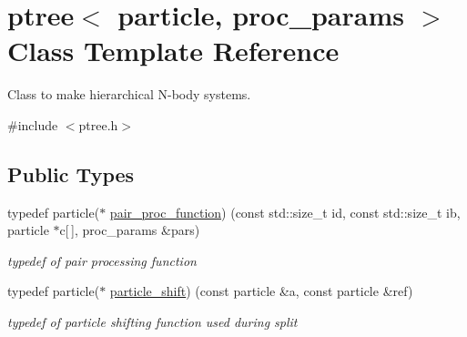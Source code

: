 \hypertarget{classptree}{}\section{ptree$<$ particle, proc\+\_\+params $>$ Class Template Reference}
\label{classptree}


Class to make hierarchical N-\/body systems.  




{\ttfamily \#include $<$ptree.\+h$>$}

\subsection*{Public Types}
\begin{DoxyCompactItemize}
\item 
typedef particle($\ast$ \hyperlink{classptree_a5dce5bec8c21e2bfb68446434e95d21a}{pair\+\_\+proc\+\_\+function}) (const std\+::size\+\_\+t id, const std\+::size\+\_\+t ib, particle $\ast$c\mbox{[}$\,$\mbox{]}, proc\+\_\+params \&pars)
\begin{DoxyCompactList}\small\item\em typedef of pair processing function \end{DoxyCompactList}\item 
typedef particle($\ast$ \hyperlink{classptree_abbd858cc881219618a3ac42f3df11cc6}{particle\+\_\+shift}) (const particle \&a, const particle \&ref)
\begin{DoxyCompactList}\small\item\em typedef of particle shifting function used during split \end{DoxyCompactList}\end{DoxyCompactItemize}
